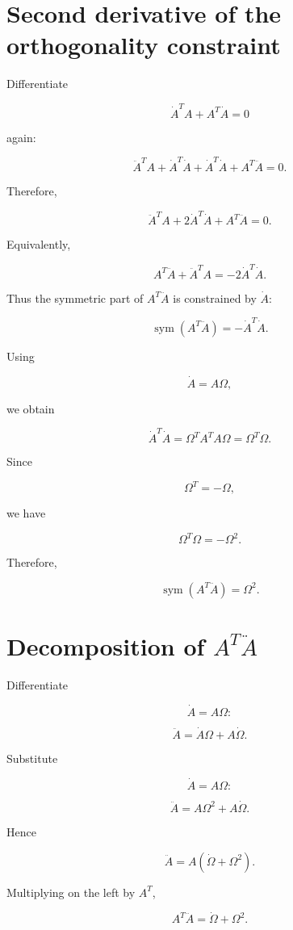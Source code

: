 \documentclass{article}
\begin{document}
\section{Second derivative of the orthogonality constraint}

Differentiate

\[
\dot A^T A+A^T\dot A=0
\]

again:

\[
\ddot A^T A + \dot A^T\dot A + \dot A^T\dot A + A^T\ddot A = 0.
\]

Therefore,

\[
\ddot A^T A + 2\dot A^T\dot A + A^T\ddot A = 0.
\]

Equivalently,

\[
A^T\ddot A + \ddot A^T A = -2\dot A^T\dot A.
\]

Thus the symmetric part of \(A^T\ddot A\) is constrained by \(\dot A\):

\[
\operatorname{sym}(A^T\ddot A) = -\dot A^T\dot A.
\]

Using

\[
\dot A=A\Omega,
\]

we obtain

\[
\dot A^T\dot A = \Omega^T A^T A\Omega = \Omega^T\Omega.
\]

Since

\[
\Omega^T=-\Omega,
\]

we have

\[
\Omega^T\Omega = -\Omega^2.
\]

Therefore,

\[
\operatorname{sym}(A^T\ddot A) = \Omega^2.
\]

\section{Decomposition of \(A^T\ddot A\)}

Differentiate

\[
\dot A=A\Omega:
\]

\[
\ddot A = \dot A\Omega + A\dot\Omega.
\]

Substitute

\[
\dot A=A\Omega:
\]

\[
\ddot A = A\Omega^2+A\dot\Omega.
\]

Hence

\[
\ddot A = A\left(\dot\Omega+\Omega^2\right).
\]

Multiplying on the left by \(A^T\),

\[
A^T\ddot A = \dot\Omega+\Omega^2.
\]
\end{document}
